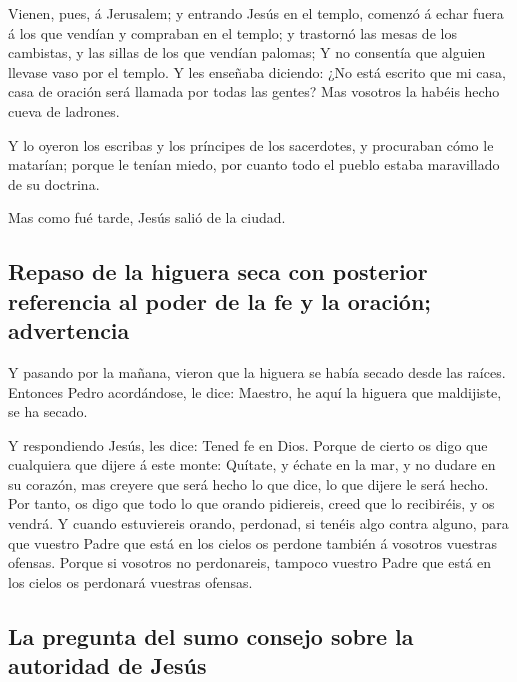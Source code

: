  Vienen, pues, á Jerusalem; y entrando Jesús en el
templo, comenzó á echar fuera á los que vendían y compraban en el
templo; y trastornó las mesas de los cambistas, y las sillas de los que
vendían palomas;  Y no consentía que alguien llevase vaso
por el templo.  Y les enseñaba diciendo: ¿No está escrito
que mi casa, casa de oración será llamada por todas las gentes? Mas
vosotros la habéis hecho cueva de ladrones.

 Y lo oyeron los escribas y los príncipes de los
sacerdotes, y procuraban cómo le matarían; porque le tenían miedo, por
cuanto todo el pueblo estaba maravillado de su doctrina.

 Mas como fué tarde, Jesús salió de la ciudad.

\hypertarget{repaso-de-la-higuera-seca-con-posterior-referencia-al-poder-de-la-fe-y-la-oraciuxf3n-advertencia}{%
\subsection{Repaso de la higuera seca con posterior referencia al poder
de la fe y la oración;
advertencia}\label{repaso-de-la-higuera-seca-con-posterior-referencia-al-poder-de-la-fe-y-la-oraciuxf3n-advertencia}}

 Y pasando por la mañana, vieron que la higuera se había
secado desde las raíces.  Entonces Pedro acordándose, le
dice: Maestro, he aquí la higuera que maldijiste, se ha secado.

 Y respondiendo Jesús, les dice: Tened fe en Dios.
 Porque de cierto os digo que cualquiera que dijere á
este monte: Quítate, y échate en la mar, y no dudare en su corazón, mas
creyere que será hecho lo que dice, lo que dijere le será hecho.
 Por tanto, os digo que todo lo que orando pidiereis,
creed que lo recibiréis, y os vendrá.  Y cuando
estuviereis orando, perdonad, si tenéis algo contra alguno, para que
vuestro Padre que está en los cielos os perdone también á vosotros
vuestras ofensas.  Porque si vosotros no perdonareis,
tampoco vuestro Padre que está en los cielos os perdonará vuestras
ofensas.

\hypertarget{la-pregunta-del-sumo-consejo-sobre-la-autoridad-de-jesuxfas}{%
\subsection{La pregunta del sumo consejo sobre la autoridad de
Jesús}\label{la-pregunta-del-sumo-consejo-sobre-la-autoridad-de-jesuxfas}}

